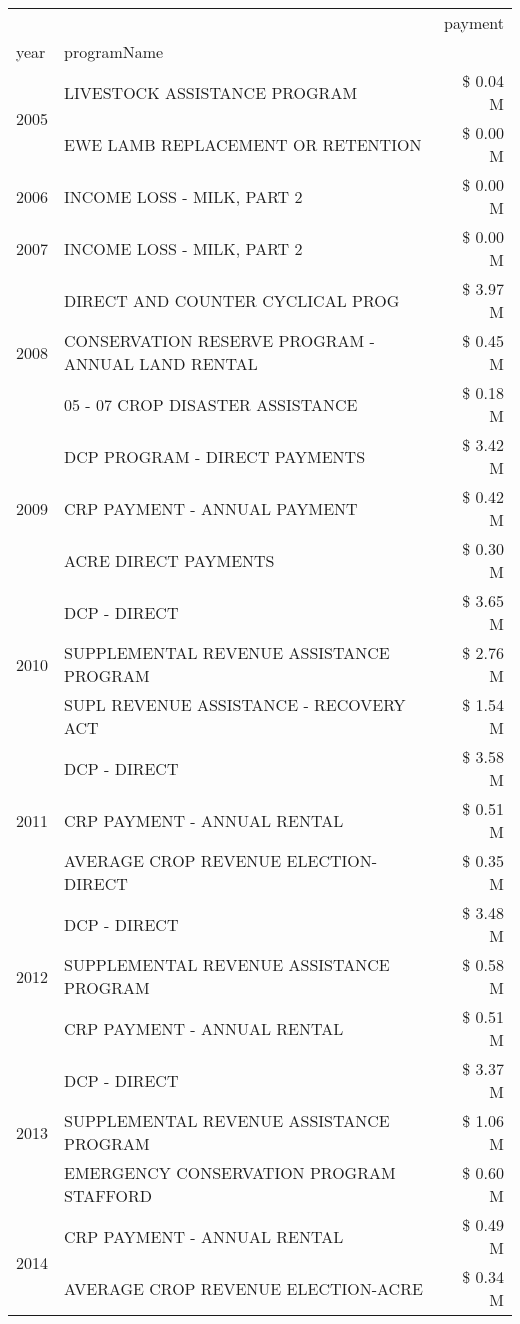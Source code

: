 \begin{tabular}{llr}
\toprule
 &  & payment \\
year & programName &  \\
\midrule
\multirow[t]{2}{*}{2005} & LIVESTOCK ASSISTANCE PROGRAM & \$ 0.04 M \\
 & EWE LAMB REPLACEMENT OR RETENTION & \$ 0.00 M \\
\cline{1-3}
2006 & INCOME LOSS - MILK, PART 2 & \$ 0.00 M \\
\cline{1-3}
2007 & INCOME LOSS - MILK, PART 2 & \$ 0.00 M \\
\cline{1-3}
\multirow[t]{3}{*}{2008} & DIRECT AND COUNTER CYCLICAL PROG & \$ 3.97 M \\
 & CONSERVATION RESERVE PROGRAM - ANNUAL LAND RENTAL & \$ 0.45 M \\
 & 05 - 07 CROP DISASTER ASSISTANCE & \$ 0.18 M \\
\cline{1-3}
\multirow[t]{3}{*}{2009} & DCP PROGRAM - DIRECT PAYMENTS & \$ 3.42 M \\
 & CRP PAYMENT - ANNUAL PAYMENT & \$ 0.42 M \\
 & ACRE DIRECT PAYMENTS & \$ 0.30 M \\
\cline{1-3}
\multirow[t]{3}{*}{2010} & DCP - DIRECT & \$ 3.65 M \\
 & SUPPLEMENTAL REVENUE ASSISTANCE PROGRAM & \$ 2.76 M \\
 & SUPL REVENUE ASSISTANCE - RECOVERY ACT & \$ 1.54 M \\
\cline{1-3}
\multirow[t]{3}{*}{2011} & DCP - DIRECT & \$ 3.58 M \\
 & CRP PAYMENT - ANNUAL RENTAL & \$ 0.51 M \\
 & AVERAGE CROP REVENUE ELECTION-DIRECT & \$ 0.35 M \\
\cline{1-3}
\multirow[t]{3}{*}{2012} & DCP - DIRECT & \$ 3.48 M \\
 & SUPPLEMENTAL REVENUE ASSISTANCE PROGRAM & \$ 0.58 M \\
 & CRP PAYMENT - ANNUAL RENTAL & \$ 0.51 M \\
\cline{1-3}
\multirow[t]{3}{*}{2013} & DCP - DIRECT & \$ 3.37 M \\
 & SUPPLEMENTAL REVENUE ASSISTANCE PROGRAM & \$ 1.06 M \\
 & EMERGENCY CONSERVATION PROGRAM STAFFORD & \$ 0.60 M \\
\cline{1-3}
\multirow[t]{3}{*}{2014} & CRP PAYMENT - ANNUAL RENTAL & \$ 0.49 M \\
 & AVERAGE CROP REVENUE ELECTION-ACRE & \$ 0.34 M \\

\end{tabular}
